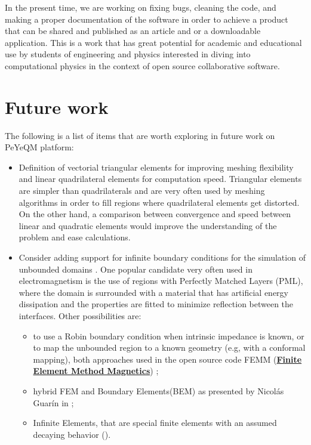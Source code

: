In the present time, we are working on fixing bugs, cleaning the code, and making a proper documentation of the software in order to achieve a product that can be shared and published as an article and or a downloadable application. This is a work that has great potential for academic and educational use by students of engineering and physics interested in diving into computational physics in the context of open source collaborative software.  
 

\section{Future work}
The following is a list of items that are worth exploring in future work on PeYeQM platform:
\begin{itemize}
%
\item Definition of vectorial triangular elements for improving meshing flexibility and linear quadrilateral elements for computation speed. Triangular elements are simpler than quadrilaterals and are very often used by meshing algorithms in order to fill regions where quadrilateral elements get distorted. On the other hand, a comparison between convergence and speed between linear and quadratic elements would improve the understanding of the problem and ease calculations.
%
\item Consider adding support for infinite boundary conditions for the simulation of unbounded domains \cite{antoine2009review, appelo2003}. One popular candidate very often used in electromagnetism is the use of regions with Perfectly Matched Layers (PML)\cite{Jin2010}, where the domain is surrounded with a material that has artificial energy dissipation and the properties are fitted to minimize reflection between the interfaces. Other possibilities are:
\begin{itemize}
\item to use a Robin boundary condition when intrinsic impedance is known, or to map the unbounded region to a known geometry (e.g, with a conformal mapping), both approaches used in the open source code FEMM (\href{http://www.femm.info/wiki/HomePage}{\textbf{Finite Element Method Magnetics}}) \cite{meeker2010_FEMM};
\item hybrid FEM and Boundary Elements(BEM) as presented by Nicol\'as Guar\'in in \cite{Guarin2012};
\item Infinite Elements, that are special finite elements with an assumed decaying behavior (\cite{Zienkiewicz2005}).
\end{itemize} 

\end{itemize}
